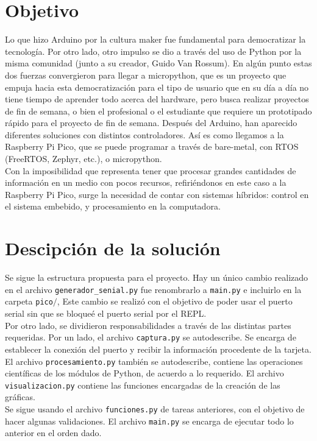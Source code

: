 \documentclass{assignment}
\begin{document}
	
	\section*{Objetivo}
	Lo que hizo Arduino por la cultura maker fue fundamental para democratizar la tecnología. Por otro lado, otro impulso se dio a través del uso de Python por la misma comunidad (junto a su creador, Guido Van Rossum). En algún punto estas dos fuerzas convergieron para llegar a micropython, que es un proyecto que empuja hacia esta democratización para el tipo de usuario que en su día a día no tiene tiempo de aprender todo acerca del hardware, pero busca realizar proyectos de fin de semana, o bien el profesional o el estudiante que requiere un prototipado rápido para el proyecto de fin de semana. Después del Arduino, han aparecido diferentes soluciones con distintos controladores. Así es como llegamos a la Raspberry Pi Pico, que se puede programar a través de bare-metal, con RTOS (FreeRTOS, Zephyr, etc.), o micropython.\\
	Con la imposibilidad que representa tener que procesar grandes cantidades de información en un medio con pocos recursos, refiriéndonos en este caso a la Raspberry Pi Pico, surge la necesidad de contar con sistemas híbridos: control en el sistema embebido, y procesamiento en la computadora.
	\section*{Descipción de la solución}
	Se sigue la estructura propuesta para el proyecto. Hay un único cambio realizado en el archivo {\tt generador\_senial.py} fue renombrarlo a {\tt main.py} e incluirlo en la carpeta {\tt pico}$\slash$, Este cambio se realizó con el objetivo de poder usar el puerto serial sin que se bloqueé el puerto serial por el REPL.\\
	Por otro lado, se dividieron responsabilidades a través de las distintas partes requeridas. Por un lado, el archivo {\tt captura.py} se autodescribe. Se encarga de establecer la conexión del puerto y recibir la información procedente de la tarjeta. El archivo {\tt procesamiento.py} también se autodescribe, contiene las operaciones científicas de los módulos de Python, de acuerdo a lo requerido. El archivo {\tt visualizacion.py} contiene las funciones encargadas de la creación de las gráficas.\\
	Se sigue usando el archivo {\tt funciones.py} de tareas anteriores, con el objetivo de hacer algunas validaciones. El archivo {\tt main.py} se encarga de ejecutar todo lo anterior en el orden dado.
\end{document}
